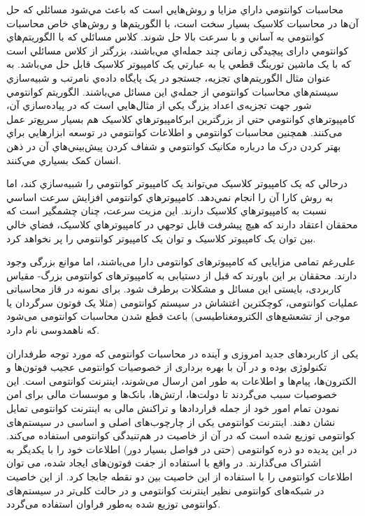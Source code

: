 محاسبات کوانتومي\cite{Nielsen1998} داراي مزايا و روش‌هايي است که باعث مي‌شود مسائلي که حل آن‌ها در محاسبات کلاسیک بسيار سخت است، با الگوریتم‌ها و روش‌هاي خاص محاسبات کوانتومي به آساني و با سرعت بالا حل شوند. کلاس مسائلي که با الگوريتم‌هاي کوانتومي دارای پیچیدگی زمانی چند جمله‌اي مي‌باشند، بزرگتر از کلاس مسائلي است که با يک ماشين تورينگ قطعي يا به عبارتي يک کامپيوتر کلاسیک قابل حل مي‌باشد. به عنوان مثال الگوريتم‌هاي تجزیه\cite{shor-1997-26}، جستجو در يک پايگاه داده‌ي نامرتب\cite{Groverd} و شبيه‌سازي سيستم‌هاي محاسبات کوانتومي از جمله‌ي اين مسائل مي‌باشند. الگوريتم کوانتومي شور  جهت تجزیه‌ی اعداد بزرگ يکي از مثال‌هايي است که در پياده‌سازي آن، کامپيوترهاي کوانتومي حتي از بزرگترين ابرکامپيوترهاي کلاسیک هم بسيار سریع‌تر عمل می‌کنند. همچنين محاسبات کوانتومي و اطلاعات کوانتومي در توسعه ابزارهايي براي بهتر کردن درک ما درباره مکانيک کوانتومي و شفاف کردن پيش‌بيني‌هاي آن در ذهن انسان کمک بسياري مي‌کنند.

درحالي که يک کامپيوتر کلاسیک مي‌تواند يک کامپيوتر کوانتومي را شبيه‌سازي کند، اما به روش کارا آن را انجام نمي‌دهد. کامپيوترهاي کوانتومي افزايش سرعت اساسي نسبت به کامپيوترهاي کلاسیک دارند. اين مزيت سرعت، چنان چشمگير است که محققان اعتقاد دارند که هيچ پيشرفت قابل توجهي در کامپيوترهاي کلاسیک، فضاي خالي بين توان يک کامپيوتر کلاسیک و توان يک کامپيوتر کوانتومي را پر نخواهد کرد.

علی‌رغم تمامی مزایایی که کامپیوترهای کوانتومی دارا می‌باشند، اما موانع بزرگی وجود دارند. محققان بر این باورند که قبل از دستیابی به کامپیوتر‌های کوانتومی بزرگ- مقیاس کاربردی، بایستی این مسائل و مشکلات برطرف شود. برای نمونه در فاز محاسباتی عملیات کوانتومی، کوچکترین اغتشاش در سیستم کوانتومی (مثلا یک فوتون سرگردان یا موجی از تشعشع‌های الکترومغناطیسی) باعث قطع شدن محاسبات کوانتومی می‌شود که ناهمدوسی نام دارد. 

یکی از کاربرد‌های جدید امروزی و آینده در محاسبات کوانتومی که مورد توجه طرفداران تکنولوژی بوده و  در آن با بهره ‌برداری از خصوصیات کوانتومی عجیب فوتون‌ها و الکترون‌ها، پیام‌ها و اطلاعات به طور امن ارسال می‌شوند، اینترنت کوانتومی است. این خصوصیات سبب می‌گردند تا دولت‌ها، ارتش‌ها، بانک‌ها و موسسات مالی برای امن نمودن تمام امور خود از جمله قراردادها و تراکنش مالی به اینترنت کوانتومی تمایل نشان دهند. اینترنت کوانتومی یکی از چارچوب‌های اصلی و اساسی در سیستم‌های کوانتومی توزیع شده است که در آن از خاصیت در هم‌تنیدگی کوانتومی استفاده می‌کند\cite{cuomo2020towards}. در این پدیده دو ذره کوانتومی (حتی در فواصل بسیار دور) اطلاعات خود را با یکدیگر به اشتراک می‌گذارند. در واقع با استفاده از جفت فوتون‌های ایجاد شده، می توان اطلاعات کوانتومی را با استفاده از این خاصیت بین دو نقطه جابجا کرد. از این خاصیت در شبکه‌های کوانتومی نظیر اینترنت کوانتومی و در حالت کلی‌تر در سیستم‌های کوانتومی توزیع شده به‌طور فراوان استفاده می‌گردد.

